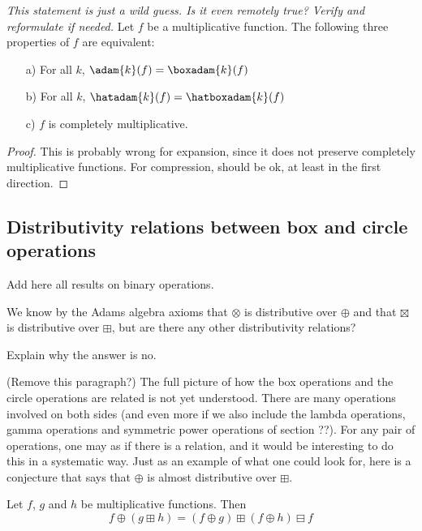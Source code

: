 \documentclass[a4paper]{article}
\begin{document}
\begin{proposition}
\emph{This statement is just a wild guess. Is it even remotely true? Verify and reformulate if needed.}
Let $f$ be a multiplicative function. The following three properties of $f$ are equivalent:
\begin{itemize}
\item[a)] For all $k$, $\adam{k}(f) = \boxadam{k}(f)$
\item[b)] For all $k$, $\hatadam{k}(f) = \hatboxadam{k}(f)$
\item[c)] $f$ is completely multiplicative.
\end{itemize}
\end{proposition}
\begin{proof}
This is probably wrong for expansion, since it does not preserve completely multiplicative functions. For compression, should be ok, at least in the first direction.
\end{proof}


\subsection{Distributivity relations between box and circle operations}

Add here all results on binary operations.

We know by the Adams algebra axioms that $\otimes$ is distributive over $\oplus$ and that $\boxtimes$ is distributive over $\boxplus$, but are there any other distributivity relations? 

Explain why the answer is no.

(Remove this paragraph?) The full picture of how the box operations and the circle operations are related is not yet understood. There are many operations involved on both sides (and even more if we also include the lambda operations, gamma operations and symmetric power operations of section ??). For any pair of operations, one may as if there is a relation, and it would be interesting to do this in a systematic way. Just as an example of what one could look for, here is a conjecture that says that $\oplus$ is almost distributive over $\boxplus$.

\begin{conjecture}
Let $f$, $g$ and $h$ be multiplicative functions. Then
$$ f \oplus (g \boxplus h) = (f \oplus g) \boxplus (f \oplus h) \boxminus f     $$
\end{conjecture}
\end{document}
